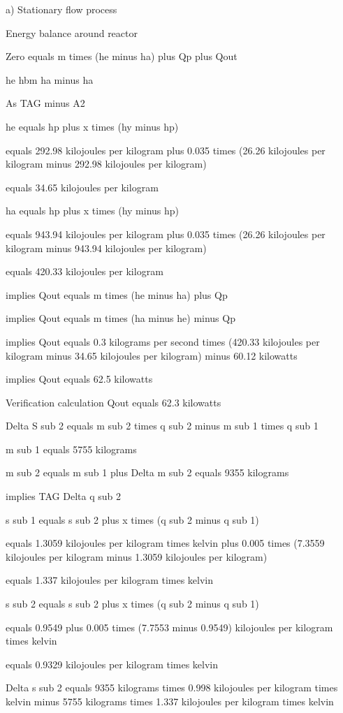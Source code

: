 a) Stationary flow process

Energy balance around reactor

Zero equals m times (he minus ha) plus Qp plus Qout

he hbm ha minus ha

As TAG minus A2

he equals hp plus x times (hy minus hp)

equals 292.98 kilojoules per kilogram plus 0.035 times (26.26 kilojoules per kilogram minus 292.98 kilojoules per kilogram)

equals 34.65 kilojoules per kilogram

ha equals hp plus x times (hy minus hp)

equals 943.94 kilojoules per kilogram plus 0.035 times (26.26 kilojoules per kilogram minus 943.94 kilojoules per kilogram)

equals 420.33 kilojoules per kilogram

implies Qout equals m times (he minus ha) plus Qp

implies Qout equals m times (ha minus he) minus Qp

implies Qout equals 0.3 kilograms per second times (420.33 kilojoules per kilogram minus 34.65 kilojoules per kilogram) minus 60.12 kilowatts

implies Qout equals 62.5 kilowatts

Verification calculation Qout equals 62.3 kilowatts

Delta S sub 2 equals m sub 2 times q sub 2 minus m sub 1 times q sub 1

m sub 1 equals 5755 kilograms

m sub 2 equals m sub 1 plus Delta m sub 2 equals 9355 kilograms

implies TAG Delta q sub 2

s sub 1 equals s sub 2 plus x times (q sub 2 minus q sub 1)

equals 1.3059 kilojoules per kilogram times kelvin plus 0.005 times (7.3559 kilojoules per kilogram minus 1.3059 kilojoules per kilogram)

equals 1.337 kilojoules per kilogram times kelvin

s sub 2 equals s sub 2 plus x times (q sub 2 minus q sub 1)

equals 0.9549 plus 0.005 times (7.7553 minus 0.9549) kilojoules per kilogram times kelvin

equals 0.9329 kilojoules per kilogram times kelvin

Delta s sub 2 equals 9355 kilograms times 0.998 kilojoules per kilogram times kelvin minus 5755 kilograms times 1.337 kilojoules per kilogram times kelvin

